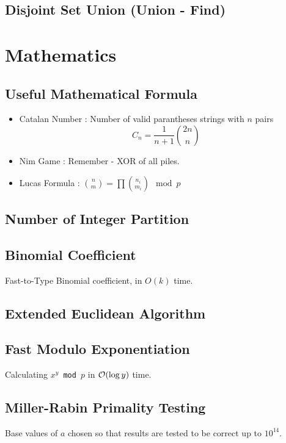 \documentclass[landscape,8pt]{article}
\begin{document}
\begin{multicols}{2}
  \subsection{Disjoint Set Union (Union - Find)}
    
\columnbreak
\section{Mathematics}
  \subsection{Useful Mathematical Formula}
    \begin{itemize}
      \item Catalan Number : Number of valid parantheses strings with $n$ pairs
      \[
        C_n = \frac{1}{n+1}\binom{2n}{n}
      \]
      \item Nim Game : Remember - XOR of all piles.
      \item Lucas Formula : $\binom{n}{m} = \prod \binom{n_i}{m_i} \mod p$
    \end{itemize}
  \subsection{Number of Integer Partition}
    

  \subsection{Binomial Coefficient}
    Fast-to-Type Binomial coefficient, in $O(k)$ time.
    

  \subsection{Extended Euclidean Algorithm}
    

  \subsection{Fast Modulo Exponentiation}
  Calculating \texttt{$x^y$ mod $p$} in $\order{\log y}$ time.
    

  \subsection{Miller-Rabin Primality Testing}
  Base values of $a$ chosen so that results are tested to be correct up to $10^{14}$.
    


\end{multicols}
\end{document}
